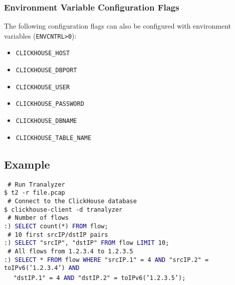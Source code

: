 \documentclass[documentation]{subfiles}
\begin{document}
\subsubsection{Environment Variable Configuration Flags}
The following configuration flags can also be configured with environment variables ({\tt ENVCNTRL>0}):
\begin{itemize}
    \item {\tt CLICKHOUSE\_HOST}
    \item {\tt CLICKHOUSE\_DBPORT}
    \item {\tt CLICKHOUSE\_USER}
    \item {\tt CLICKHOUSE\_PASSWORD}
    \item {\tt CLICKHOUSE\_DBNAME}
    \item {\tt CLICKHOUSE\_TABLE\_NAME}
\end{itemize}

\subsection{Example}

{\tt\color{blue} \# Run Tranalyzer}\\
{\tt \$ t2 -r file.pcap}\\

\noindent
{\tt\color{blue} \# Connect to the ClickHouse database}\\
{\tt \$ clickhouse-client -d tranalyzer}\\

\noindent
{\tt\color{blue} \# Number of flows}\\
{\tt :)\ \textcolor{darkblue}{SELECT} count(*) \textcolor{darkblue}{FROM} flow;}\\

\noindent
{\tt\color{blue} \# 10 first srcIP/dstIP pairs}\\
{\tt :)\ \textcolor{darkblue}{SELECT} "srcIP", "dstIP" \textcolor{darkblue}{FROM} flow \textcolor{darkblue}{LIMIT} 10;}\\

\noindent
{\tt\color{blue} \# All flows from 1.2.3.4 to 1.2.3.5}\\
{\tt :)\ \textcolor{darkblue}{SELECT} * \textcolor{darkblue}{FROM} flow \textcolor{darkblue}{WHERE} "srcIP.1" = 4 \textcolor{darkblue}{AND} "srcIP.2" = toIPv6('1.2.3.4') \textcolor{darkblue}{AND}}\\
\indent\indent\indent\indent\indent\indent\indent\indent\indent~~ {\tt "dstIP.1" = 4 \textcolor{darkblue}{AND} "dstIP.2" = toIPv6('1.2.3.5');}\\
\end{document}
